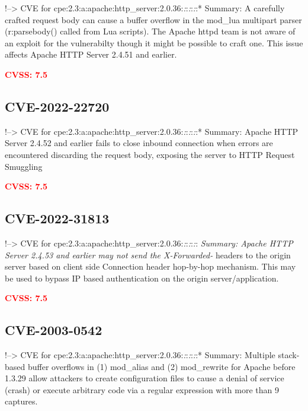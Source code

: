 \documentclass[a4paper, 12pt]{article}
\begin{document}
!--\textgreater{} CVE for
cpe:2.3:a:apache:http\_server:2.0.36:\emph{:}:\emph{:}:\emph{:}:*
Summary: A carefully crafted request body can cause a buffer overflow in
the mod\_lua multipart parser (r:parsebody() called from Lua scripts).
The Apache httpd team is not aware of an exploit for the vulnerabilty
though it might be possible to craft one. This issue affects Apache HTTP
Server 2.4.51 and earlier.

\textbf{\textcolor{red}{CVSS: 7.5}}

\hypertarget{cve-2022-22720}{%
\subsection{CVE-2022-22720}\label{cve-2022-22720}}

!--\textgreater{} CVE for
cpe:2.3:a:apache:http\_server:2.0.36:\emph{:}:\emph{:}:\emph{:}:*
Summary: Apache HTTP Server 2.4.52 and earlier fails to close inbound
connection when errors are encountered discarding the request body,
exposing the server to HTTP Request Smuggling

\textbf{\textcolor{red}{CVSS: 7.5}}

\hypertarget{cve-2022-31813}{%
\subsection{CVE-2022-31813}\label{cve-2022-31813}}

!--\textgreater{} CVE for
cpe:2.3:a:apache:http\_server:2.0.36:\emph{:}:\emph{:}:\emph{:}:\emph{
Summary: Apache HTTP Server 2.4.53 and earlier may not send the
X-Forwarded-} headers to the origin server based on client side
Connection header hop-by-hop mechanism. This may be used to bypass IP
based authentication on the origin server/application.

\textbf{\textcolor{red}{CVSS: 7.5}}

\hypertarget{cve-2003-0542}{%
\subsection{CVE-2003-0542}\label{cve-2003-0542}}

!--\textgreater{} CVE for
cpe:2.3:a:apache:http\_server:2.0.36:\emph{:}:\emph{:}:\emph{:}:*
Summary: Multiple stack-based buffer overflows in (1) mod\_alias and (2)
mod\_rewrite for Apache before 1.3.29 allow attackers to create
configuration files to cause a denial of service (crash) or execute
arbitrary code via a regular expression with more than 9 captures.
\end{document}
